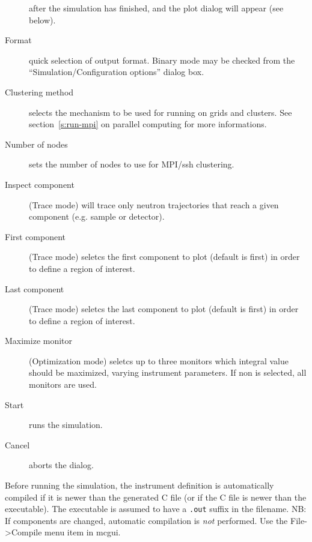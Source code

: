 \begin{description}
  after the simulation has finished, and the plot dialog will appear
  (see below).
\item[Format] quick selection of output format. Binary mode may be checked from the ``Simulation/Configuration options'' dialog box.
\item[Clustering method] selects the mechanism to be used for running on grids and clusters.
  See section~\ref{s:run-mpi} on parallel computing for more informations.
\item[Number of nodes] sets the number of nodes to use for MPI/ssh clustering.
\item[Inspect component] (Trace mode) will trace only neutron trajectories that reach a given component (e.g. sample or detector).
\item[First component] (Trace mode) seletcs the first component to plot (default is first) in order to define a region of interest.
\item[Last component] (Trace mode) seletcs the last component to plot (default is first) in order to define a region of interest.
\item[Maximize monitor] (Optimization mode) seletcs up to three monitors which integral value should be maximized, varying instrument parameters. If non is selected, all monitors are used.
\item[Start] runs the simulation.
\item[Cancel] aborts the dialog.
\end{description}

Before running the simulation, the instrument definition is
automatically compiled if it is newer than the generated C file (or if the C file
is newer than the executable). The executable is
assumed to have a \verb+.out+ suffix in the filename. NB: If
components are changed, automatic compilation is \emph{not}
performed. Use the File->Compile menu item in mcgui.


